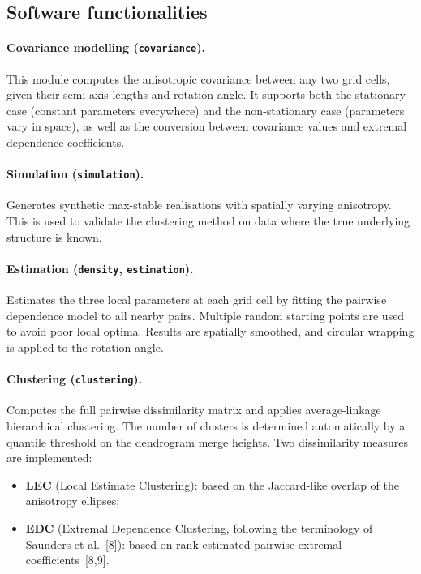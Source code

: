 \documentclass[preprint,12pt,a4paper]{elsarticle}
\begin{document}
\subsection{Software functionalities}
\label{sec:functionalities}

\paragraph{Covariance modelling (\texttt{covariance}).}
This module computes the anisotropic covariance between any two
grid cells, given their semi-axis lengths and rotation angle.
It supports both the stationary case (constant parameters
everywhere) and the non-stationary case (parameters vary in
space), as well as the conversion between covariance values and
extremal dependence coefficients.

\paragraph{Simulation (\texttt{simulation}).}
Generates synthetic max-stable realisations with spatially
varying anisotropy.  This is used to validate the clustering
method on data where the true underlying structure is known.

\paragraph{Estimation (\texttt{density}, \texttt{estimation}).}
Estimates the three local parameters at each grid cell by fitting
the pairwise dependence model to all nearby pairs.  Multiple
random starting points are used to avoid poor local optima.
Results are spatially smoothed, and circular wrapping is
applied to the rotation angle.

\paragraph{Clustering (\texttt{clustering}).}
Computes the full pairwise dissimilarity matrix and applies
average-linkage hierarchical clustering.  The number of clusters
is determined automatically by a quantile threshold on the
dendrogram merge heights.  Two dissimilarity measures are
implemented:
\begin{itemize}
\item \textbf{LEC} (Local Estimate Clustering): based on the
  Jaccard-like overlap of the anisotropy ellipses;
\item \textbf{EDC} (Extremal Dependence Clustering, following
  the terminology of Saunders et al.~[8]): based on
  rank-estimated pairwise extremal coefficients~[8,9].
\end{itemize}
\end{document}
